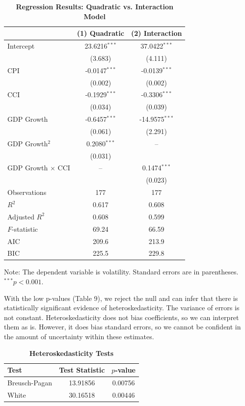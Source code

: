 \vspace{0.8em}
\begin{table}[H]
\centering
\caption{\textbf{Regression Results: Quadratic vs. Interaction Model}}
\label{tab:model_compare_quad_int}
\renewcommand{\arraystretch}{1.3}
\setlength{\tabcolsep}{16pt}
\begin{tabular}{lcc}
\toprule
 & (1) Quadratic & (2) Interaction \\
\midrule
Intercept & 23.6216$^{***}$ & 37.0422$^{***}$ \\
 & (3.683) & (4.111) \\
CPI & -0.0147$^{***}$ & -0.0139$^{***}$ \\
 & (0.002) & (0.002) \\
CCI & -0.1929$^{***}$ & -0.3306$^{***}$ \\
 & (0.034) & (0.039) \\
GDP Growth & -0.6457$^{***}$ & -14.9575$^{***}$ \\
 & (0.061) & (2.291) \\
GDP Growth$^2$ & 0.2080$^{***}$ & -- \\
 & (0.031) & \\
GDP Growth $\times$ CCI & -- & 0.1474$^{***}$ \\
 & & (0.023) \\
\midrule
Observations & 177 & 177 \\
$R^2$ & 0.617 & 0.608 \\
Adjusted $R^2$ & 0.608 & 0.599 \\
$F$-statistic & 69.24 & 66.59 \\
AIC & 209.6 & 213.9 \\
BIC & 225.5 & 229.8 \\
\bottomrule
\end{tabular}

\vspace{0.5em}
\footnotesize Note: The dependent variable is volatility. Standard errors are in parentheses. $^{***}p<0.001$.
\end{table}

\vspace{0.8em}
With the low p-values (Table 9), we reject the null and can infer that there is statistically significant evidence of heteroskedasticity. The variance of errors is not constant. Heteroskedasticity does not bias coefficients, so we can interpret them as is. However, it does bias standard errors, so we cannot be confident in the amount of uncertainty within these estimates. 

\vspace{0.5em}
\begin{table}[H]
\centering
\caption{\textbf{Heteroskedasticity Tests}}
\label{tab:het_tests}
\renewcommand{\arraystretch}{1.3}
\begin{tabular}{lcc}
\toprule
Test & Test Statistic & $p$-value \\
\midrule
Breusch-Pagan & 13.91856 & 0.00756 \\
White & 30.16518 & 0.00446 \\
\bottomrule
\end{tabular}

\vspace{0.8em}
\end{table}

